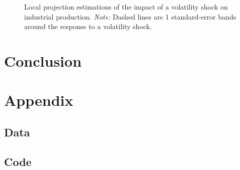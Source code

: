 \documentclass[a4paper,12pt,oneside,pointednumbers,numbers=noenddot,bibtotoc,bigheadings,liststotoc,chapterprefix=true]{scrbook}
\begin{document}
\begin{figure}[hbt]
   \centering
   \setlength\fboxsep{0pt}
   \setlength\fboxrule{0pt}
      \caption[Local projection estimations of the impact of a volatility shock on employment in manufacturing.]{Local projection estimations of the impact of a volatility shock on industrial production.
      \textit{Note:} Dashed lines are 1 standard-error bands around the response to a volatility shock.}
   \label{fig:irf2}
\end{figure}


\chapter{Conclusion}




\newpage
\appendix

\chapter{Appendix}
\section{Data}
\label{sec:data}
\section{Code}
\label{sec:rcode}

\end{document}
